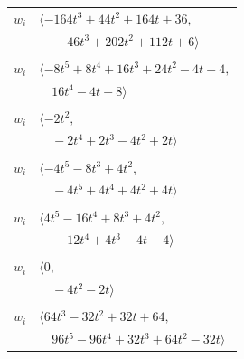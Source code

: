 \documentclass[11pt]{article}
\begin{document}
\begin{longtable}{@{}ll@{}}
$w_i$ & $\langle -164t^{3}+44t^{2}+164t+36,$\\
 & $\quad -46t^{3}+202t^{2}+112t+6\rangle$\\
\addlinespace[2pt]
\multicolumn{2}{@{}p{0.97\textwidth}@{}}{$i=5$, $D_i=4$, $\rho_{ij}$: $14{:}2, \allowbreak 17{:}2, \allowbreak 23{:}1, \allowbreak 31{:}1, \allowbreak 37{:}1, \allowbreak 40{:}2, \allowbreak 46{:}2$}\\
$w_i$ & $\langle -8t^{5}+8t^{4}+16t^{3}+24t^{2}-4t-4,$\\
 & $\quad 16t^{4}-4t-8\rangle$\\
\addlinespace[2pt]
\multicolumn{2}{@{}p{0.97\textwidth}@{}}{$i=6$, $D_i=2$, $\rho_{ij}$: $0{:}2, \allowbreak 16{:}2, \allowbreak 23{:}2, \allowbreak 25{:}1, \allowbreak 30{:}1$}\\
$w_i$ & $\langle -2t^{2},$\\
 & $\quad -2t^{4}+2t^{3}-4t^{2}+2t\rangle$\\
\addlinespace[2pt]
\multicolumn{2}{@{}p{0.97\textwidth}@{}}{$i=7$, $D_i=4$, $\rho_{ij}$: $0{:}1, \allowbreak 2{:}2, \allowbreak 21{:}1, \allowbreak 27{:}2, \allowbreak 45{:}1$}\\
$w_i$ & $\langle -4t^{5}-8t^{3}+4t^{2},$\\
 & $\quad -4t^{5}+4t^{4}+4t^{2}+4t\rangle$\\
\addlinespace[2pt]
\multicolumn{2}{@{}p{0.97\textwidth}@{}}{$i=8$, $D_i=4$, $\rho_{ij}$: $0{:}1, \allowbreak 1{:}1, \allowbreak 16{:}2, \allowbreak 18{:}2, \allowbreak 23{:}2, \allowbreak 33{:}2$}\\
$w_i$ & $\langle 4t^{5}-16t^{4}+8t^{3}+4t^{2},$\\
 & $\quad -12t^{4}+4t^{3}-4t-4\rangle$\\
\addlinespace[2pt]
\multicolumn{2}{@{}p{0.97\textwidth}@{}}{$i=9$, $D_i=2$, $\rho_{ij}$: $1{:}1, \allowbreak 17{:}1, \allowbreak 18{:}1, \allowbreak 20{:}1, \allowbreak 33{:}1, \allowbreak 44{:}1$}\\
$w_i$ & $\langle 0,$\\
 & $\quad -4t^{2}-2t\rangle$\\
\addlinespace[2pt]
\multicolumn{2}{@{}p{0.97\textwidth}@{}}{$i=10$, $D_i=32$, $\rho_{ij}$: $1{:}1, \allowbreak 3{:}2, \allowbreak 17{:}1, \allowbreak 25{:}1, \allowbreak 40{:}2, \allowbreak 41{:}1, \allowbreak 45{:}1, \allowbreak 47{:}1$}\\
$w_i$ & $\langle 64t^{3}-32t^{2}+32t+64,$\\
 & $\quad 96t^{5}-96t^{4}+32t^{3}+64t^{2}-32t\rangle$\\

\end{longtable}
\end{document}
